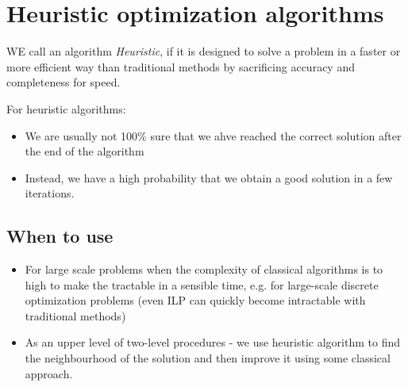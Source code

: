 
\chapter{Heuristic optimization algorithms}



{
    WE call an algorithm \textit{Heuristic}, if it is designed to solve a problem in a faster or more efficient way than
    traditional methods by sacrificing accuracy and completeness for speed.

    For heuristic algorithms:
    \begin{itemize}
            \item We are usually not 100\% sure that we ahve reached the correct solution after the end of the algorithm
            \item Instead, we have a high probability that we obtain a good solution in a few iterations.
    \end{itemize}
}
\section{When to use}
\begin{itemize}
        \item For large scale problems when the complexity of classical algorithms is to high to make the tractable in a sensible  time, e.g. for large-scale discrete optimization problems (even ILP can quickly become intractable with traditional methods)
        \item As an upper level of two-level procedures - we use heuristic algorithm to find the neighbourhood of the solution and then improve it using some classical approach.

\end{itemize}

